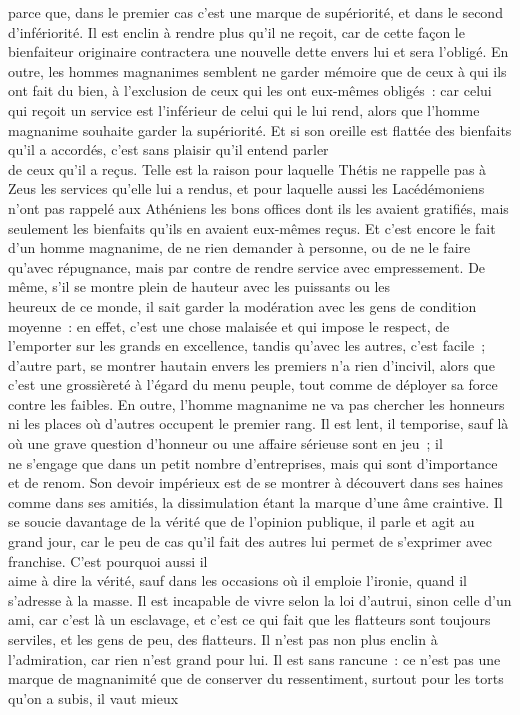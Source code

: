 \documentclass[french,twoside]{book} %
\begin{document}
parce que, dans le premier cas c’est une marque de supériorité, et dans le second d’infériorité. Il est enclin à rendre plus qu’il ne reçoit, car de cette façon le bienfaiteur originaire contractera une nouvelle dette envers lui et sera l’obligé. En outre, les hommes magnanimes semblent ne garder mémoire que de ceux à qui ils ont fait du bien, à l’exclusion de ceux qui les ont eux-mêmes obligés : car celui qui reçoit un service est l’inférieur de celui qui le lui rend, alors que l’homme magnanime souhaite garder la supériorité. Et si son oreille est flattée des bienfaits qu’il a accordés, c’est sans plaisir qu’il entend parler \\
de ceux qu’il a reçus. Telle est la raison pour laquelle Thétis ne rappelle pas à Zeus les services qu’elle lui a rendus, et pour laquelle aussi les Lacédémoniens n’ont pas rappelé aux Athéniens les bons offices dont ils les avaient gratifiés, mais seulement les bienfaits qu’ils en avaient eux-mêmes reçus. Et c’est encore le fait d’un homme magnanime, de ne rien demander à personne, ou de ne le faire qu’avec répugnance, mais par contre de rendre service avec empressement. De même, s’il se montre plein de hauteur avec les puissants ou les \\
heureux de ce monde, il sait garder la modération avec les gens de condition moyenne : en effet, c’est une chose malaisée et qui impose le respect, de l’emporter sur les grands en excellence, tandis qu’avec les autres, c’est facile ; d’autre part, se montrer hautain envers les premiers n’a rien d’incivil, alors que c’est une grossièreté à l’égard du menu peuple, tout comme de déployer sa force contre les faibles. En outre, l’homme magnanime ne va pas chercher les honneurs ni les places où d’autres occupent le premier rang. Il est lent, il temporise, sauf là où une grave question d’honneur ou une affaire sérieuse sont en jeu ; il \\
ne s’engage que dans un petit nombre d’entreprises, mais qui sont d’importance et de renom. Son devoir impérieux est de se montrer à découvert dans ses haines comme dans ses amitiés, la dissimulation étant la marque d’une âme craintive. Il se soucie davantage de la vérité que de l’opinion publique, il parle et agit au grand jour, car le peu de cas qu’il fait des autres lui permet de s’exprimer avec franchise. C’est pourquoi aussi il \\
aime à dire la vérité, sauf dans les occasions où il emploie l’ironie, quand il s’adresse à la masse. Il est incapable de vivre  selon la loi d’autrui, sinon celle d’un ami, car c’est là un esclavage, et c’est ce qui fait que les flatteurs sont toujours serviles, et les gens de peu, des flatteurs. Il n’est pas non plus enclin à l’admiration, car rien n’est grand pour lui. Il est sans rancune : ce n’est pas une marque de magnanimité que de conserver du ressentiment, surtout pour les torts qu’on a subis, il vaut mieux \\
\end{document}
